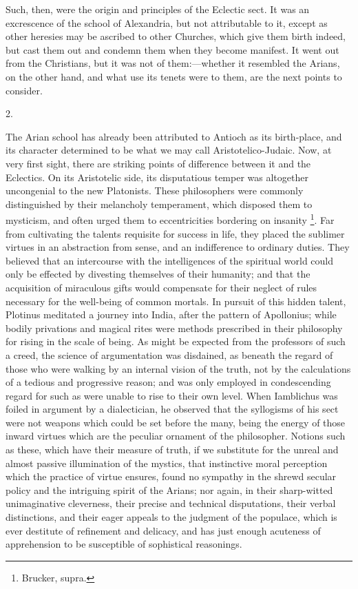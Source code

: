 Such, then, were the origin and principles of the Eclectic sect. It
was an excrescence of the school of Alexandria, but not attributable
to it, except as other heresies may be ascribed to other Churches,
which give them birth indeed, but cast them out and condemn them when
they become manifest. It went out from the Christians, but it
was not of them:—whether it resembled the Arians, on the other hand,
and what use its tenets were to them, are the next points to consider.

2.

The Arian school has already been attributed to Antioch as its
birth-place, and its character determined to be what we may call
Aristotelico-Judaic. Now, at very first sight, there are striking
points of difference between it and the Eclectics. On its Aristotelic
side, its disputatious temper was altogether uncongenial to the new
Platonists. These philosophers were commonly distinguished by their
melancholy temperament, which disposed them to mysticism, and often
urged them to eccentricities bordering on insanity \footnote{Brucker, supra.}. Far from cultivating the talents requisite for success in
life, they placed the sublimer virtues in an abstraction from sense,
and an indifference to ordinary duties. They believed that an
intercourse with the intelligences of the spiritual world could only
be effected by divesting themselves of their humanity; and that the
acquisition of miraculous gifts would compensate for their neglect of
rules necessary for the well-being of common mortals. In pursuit of
this hidden talent, Plotinus meditated a journey into India, after the
pattern of Apollonius; while bodily privations and magical rites were
methods prescribed in their philosophy for rising in the scale of
being. As might be expected from the professors of such a creed, the
science of argumentation was disdained, as beneath the regard of those
who were walking by an internal vision of the truth, not by the
calculations of a tedious and progressive reason; and was only
employed in condescending regard for such as were unable to rise to
their own level. When Iamblichus was foiled in argument by a
dialectician, he observed that the syllogisms of his sect were not
weapons which could be set before the many, being the energy of those
inward virtues which are the peculiar ornament of the philosopher.
Notions such as these, which have their measure of truth, if we
substitute for the unreal and almost passive illumination of the
mystics, that instinctive moral perception which the practice of
virtue ensures, found no sympathy in the shrewd secular policy and the
intriguing spirit of the Arians; nor again, in their sharp-witted
unimaginative cleverness, their precise and technical disputations,
their verbal distinctions, and their eager appeals to the judgment of
the populace, which is ever destitute of refinement and delicacy, and
has just enough acuteness of apprehension to be susceptible of
sophistical reasonings.

